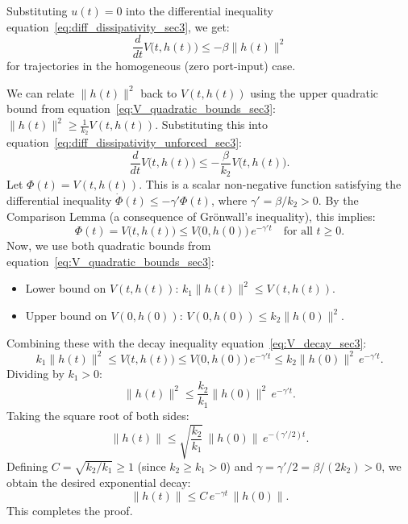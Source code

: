\documentclass[10pt]{article} %
\def\eqref#1{equation~\ref{#1}}
\theoremstyle{definition}
\begin{document}
Substituting $u(t) = 0$ into the differential inequality \eqref{eq:diff_dissipativity_sec3}, we get:
\begin{equation} \label{eq:diff_dissipativity_unforced_sec3} %
\frac{d}{dt} V\bigl(t, h(t)\bigr) \le - \beta \|h(t)\|^2
\end{equation}
for trajectories in the homogeneous (zero port-input) case.

We can relate $\|h(t)\|^2$ back to $V(t,h(t))$ using the upper quadratic bound from \eqref{eq:V_quadratic_bounds_sec3}: $\|h(t)\|^2 \ge \frac{1}{k_2} V(t, h(t))$. Substituting this into \eqref{eq:diff_dissipativity_unforced_sec3}:
\begin{equation}
\frac{d}{dt} V\bigl(t, h(t)\bigr) \le - \frac{\beta}{k_2} V\bigl(t, h(t)\bigr).
\end{equation}
Let $\Phi(t) = V(t, h(t))$. This is a scalar non-negative function satisfying the differential inequality $\dot{\Phi}(t) \le -\gamma' \Phi(t)$, where $\gamma' = \beta/k_2 > 0$.
By the Comparison Lemma (a consequence of Grönwall's inequality), this implies:
\begin{equation} \label{eq:V_decay_sec3} %
\Phi(t) = V\bigl(t, h(t)\bigr) \le V\bigl(0, h(0)\bigr) \, e^{-\gamma' t} \quad \text{for all } t \ge 0.
\end{equation}
Now, we use both quadratic bounds from \eqref{eq:V_quadratic_bounds_sec3}:
\begin{itemize}
    \item Lower bound on $V(t,h(t))$: $k_1 \|h(t)\|^2 \le V(t, h(t))$.
    \item Upper bound on $V(0,h(0))$: $V(0, h(0)) \le k_2 \|h(0)\|^2$.
\end{itemize}
Combining these with the decay inequality \eqref{eq:V_decay_sec3}:
\begin{equation}
k_1 \|h(t)\|^2 \le V\bigl(t, h(t)\bigr) \le V\bigl(0, h(0)\bigr) \, e^{-\gamma' t} \le k_2 \|h(0)\|^2 \, e^{-\gamma' t}.
\end{equation}
Dividing by $k_1 > 0$:
\begin{equation}
\|h(t)\|^2 \le \frac{k_2}{k_1} \|h(0)\|^2 \, e^{-\gamma' t}.
\end{equation}
Taking the square root of both sides:
\begin{equation}
\|h(t)\| \le \sqrt{\frac{k_2}{k_1}} \, \|h(0)\| \, e^{-(\gamma'/2) t}.
\end{equation}
Defining $C = \sqrt{k_2/k_1} \ge 1$ (since $k_2 \ge k_1 > 0$) and $\gamma = \gamma'/2 = \beta/(2k_2) > 0$, we obtain the desired exponential decay:
\begin{equation}
\|h(t)\| \le C \, e^{-\gamma t} \, \|h(0)\|.
\end{equation}
This completes the proof.
\end{document}
